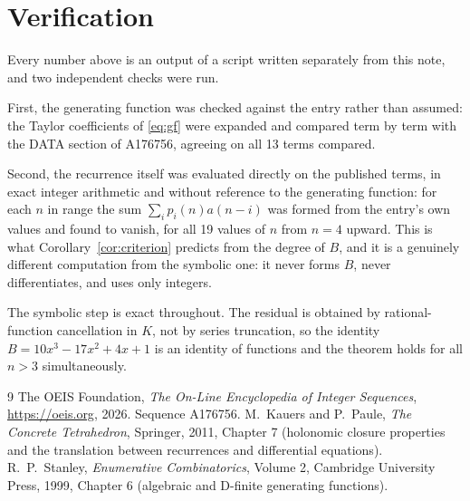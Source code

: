 \documentclass[11pt,a4paper]{article}
\theoremstyle{plain}
\theoremstyle{definition}
\begin{document}
\section{Verification}

Every number above is an output of a script written separately from this note, and two
independent checks were run.

First, the generating function was checked against the entry rather than assumed: the
Taylor coefficients of \eqref{eq:gf} were expanded and compared term by term with the DATA
section of A176756, agreeing on all 13 terms compared.

Second, the recurrence itself was evaluated directly on the published terms, in exact
integer arithmetic and without reference to the generating function: for each $n$ in range
the sum $\sum_{i}p_{i}(n)a(n-i)$ was formed from the entry's own values and found to
vanish, for all 19 values of $n$ from $n=4$ upward. This is what
Corollary~\ref{cor:criterion} predicts from the degree of $B$, and it is a genuinely
different computation from the symbolic one: it never forms $B$, never differentiates, and
uses only integers.

The symbolic step is exact throughout. The residual is obtained by rational-function
cancellation in $K$, not by series truncation, so the identity $B=10 x^{3} - 17 x^{2} + 4 x + 1$ is an
identity of functions and the theorem holds for all $n>3$ simultaneously.

\begin{thebibliography}{9}
 The OEIS Foundation, \emph{The On-Line Encyclopedia of Integer Sequences},
\url{https://oeis.org}, 2026. Sequence A176756.
 M.~Kauers and P.~Paule, \emph{The Concrete Tetrahedron}, Springer, 2011,
Chapter 7 (holonomic closure properties and the translation between recurrences and
differential equations).
 R.~P.~Stanley, \emph{Enumerative Combinatorics}, Volume 2, Cambridge
University Press, 1999, Chapter 6 (algebraic and D-finite generating functions).
\end{thebibliography}
\end{document}
